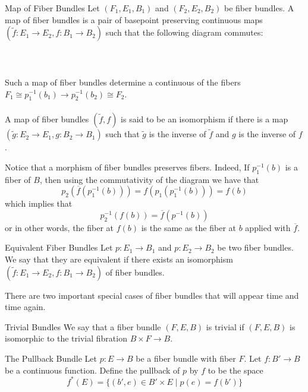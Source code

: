 \documentclass[a4paper]{article}
\begin{document}
\begin{defn}{Map of Fiber Bundles}{} Let $(F_1,E_1,B_1)$ and $(F_2,E_2,B_2)$ be fiber bundles. A map of fiber bundles is a pair of basepoint preserving continuous maps $(\tilde{f}:E_1\to E_2,f:B_1\to B_2)$ such that the following diagram commutes: \\~\\
\\~\\
Such a map of fiber bundles determine a continuous of the fibers $F_1\cong p_1^{-1}(b_1)\to p_2^{-1}(b_2)\cong F_2$. \\~\\

A map of fiber bundles $(\tilde{f},f)$ is said to be an isomorphism if there is a map $(\tilde{g}:E_2\to E_1,g:B_2\to B_1)$ such that $\tilde{g}$ is the inverse of $\tilde{f}$ and $g$ is the inverse of $f$. 
\end{defn}

Notice that a morphism of fiber bundles preserves fibers. Indeed, If $p_1^{-1}(b)$ is a fiber of $B$, then using the commutativity of the diagram we have that $$p_2(\overline{f}(p_1^{-1}(b)))=f(p_1(p_1^{-1}(b)))=f(b)$$ which implies that $$p_2^{-1}(f(b))=\overline{f}(p^{-1}(b))$$ or in other words, the fiber at $f(b)$ is the same as the fiber at $b$ applied with $\overline{f}$. 

\begin{defn}{Equivalent Fiber Bundles}{} Let $p:E_1\to B_1$ and $p:E_2\to B_2$ be two fiber bundles. We say that they are equivalent if there exists an isomorphism $(\tilde{f}:E_1\to E_2,f:B_1\to B_2)$ of fiber bundles. 
\end{defn}

There are two important special cases of fiber bundles that will appear time and time again. 

\begin{defn}{Trivial Bundles}{} We say that a fiber bundle $(F,E,B)$ is trivial if $(F,E,B)$ is isomorphic to the trivial fibration $B\times F\to B$. 
\end{defn}

\begin{defn}{The Pullback Bundle}{} Let $p:E\to B$ be a fiber bundle with fiber $F$. Let $f:B'\to B$ be a continuous function. Define the pullback of $p$ by $f$ to be the space $$f^\ast(E)=\{(b',e)\in B'\times E\;|\;p(e)=f(b')\}$$
\end{defn}
\end{document}
